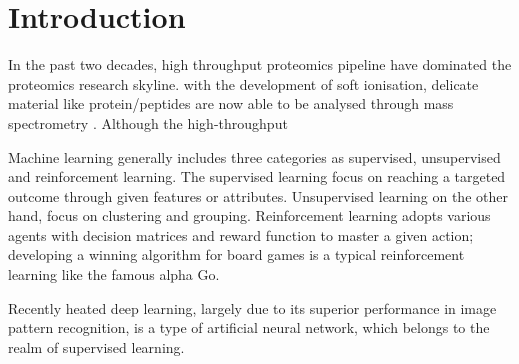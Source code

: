\section{Introduction}

In the past two decades, high throughput proteomics pipeline have dominated the proteomics research skyline. with the development of soft ionisation, delicate material like protein/peptides are now able to be analysed through mass spectrometry . Although the high-throughput   
\par 
Machine learning generally includes three categories as supervised, unsupervised and reinforcement learning. The supervised learning focus on reaching a targeted outcome through given features or attributes. Unsupervised learning on the other hand, focus on clustering and grouping. Reinforcement learning adopts various agents with decision matrices and reward function to master a given action; developing a winning algorithm for board games is a typical reinforcement learning like the famous alpha Go.
\par
Recently heated deep learning, largely due to its superior performance in image pattern recognition, is a type of artificial neural network, which belongs to the realm of supervised learning. 

